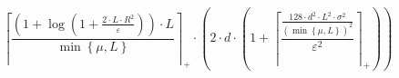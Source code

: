 \[\left\lceil \frac{\left(1 + \log\left(1 + \frac{2 \cdot L \cdot R^{2}}{\varepsilon}\right)\right) \cdot L}{\min\left\{ \mu, L \right\}} \right\rceil_{+} \cdot \left(2 \cdot d \cdot \left(1 + \left\lceil \frac{\frac{128 \cdot d^{2} \cdot L^{2} \cdot \sigma^{2}}{\left(\min\left\{ \mu, L \right\}\right)^{2}}}{\varepsilon^{2}} \right\rceil_{+}\right)\right)\]
